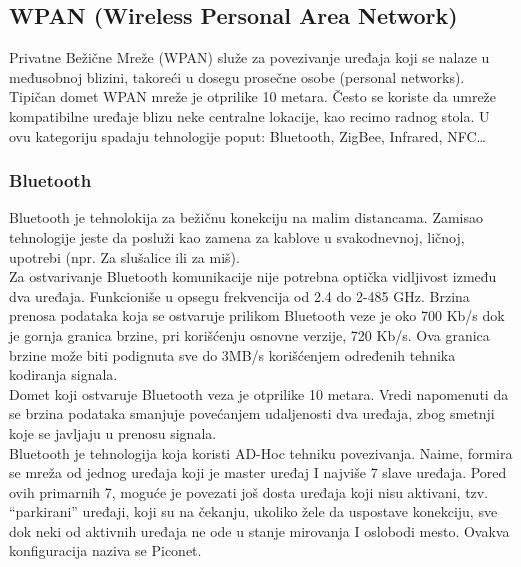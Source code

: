 \documentclass[a4paper]{article}
\begin{document}
{    \subsection{WPAN (Wireless Personal Area Network)}
Privatne Bežične Mreže (WPAN) služe za povezivanje uređaja koji se nalaze u međusobnoj blizini, takoreći u dosegu prosečne osobe (personal networks). Tipičan domet WPAN mreže je otprilike 10 metara. Često se koriste da umreže kompatibilne uređaje blizu neke centralne lokacije, kao recimo radnog stola. U ovu kategoriju spadaju tehnologije poput: Bluetooth, ZigBee, Infrared, NFC…
        \subsubsection{Bluetooth}
Bluetooth je tehnolokija za bežičnu konekciju na malim distancama. Zamisao tehnologije jeste da posluži kao zamena za kablove u svakodnevnoj, ličnoj, upotrebi (npr. Za slušalice ili za miš).\\
Za ostvarivanje Bluetooth komunikacije nije potrebna optička vidljivost između dva uređaja. Funkcioniše u opsegu frekvencija od 2.4 do 2-485 GHz. Brzina prenosa podataka koja se ostvaruje prilikom Bluetooth veze je oko 700 Kb/s dok je gornja granica brzine, pri korišćenju osnovne verzije, 720 Kb/s. Ova granica brzine može biti podignuta sve do 3MB/s korišćenjem određenih tehnika kodiranja signala.\\
Domet koji ostvaruje Bluetooth veza je otprilike 10 metara. Vredi napomenuti da se brzina podataka smanjuje povećanjem udaljenosti dva uređaja, zbog smetnji koje se javljaju u prenosu signala.\\
Bluetooth je tehnologija koja koristi AD-Hoc tehniku povezivanja. Naime, formira se mreža od jednog uređaja koji je master uređaj I najviše 7 slave uređaja. Pored ovih primarnih 7, moguće je povezati još dosta uređaja koji nisu aktivani, tzv. “parkirani” uređaji, koji su na čekanju, ukoliko žele da uspostave konekciju, sve dok neki od aktivnih uređaja ne ode u stanje mirovanja I oslobodi mesto. Ovakva konfiguracija naziva se Piconet.\\
}
\end{document}
